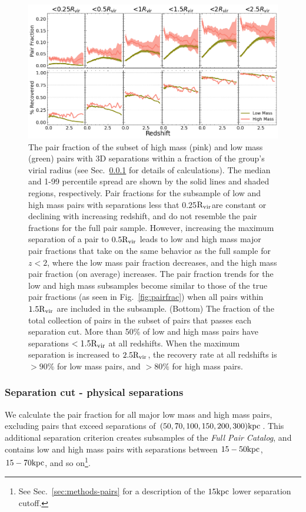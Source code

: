 \documentclass[twocolumn]{aastex631}
\newcommand{\paircat}{\textit{Full Pair Catalog}}
\newcommand{\Rvir}{\ensuremath{\rm R_{vir}}}
\begin{document}
    \begin{figure}[htp]
        \centering
        \includegraphics[width=\textwidth]{pairfrac_vircut.png}
        \caption{ The pair fraction of the subset of high mass (pink) and low mass (green) pairs with 3D separations within a fraction of the group's virial radius (see Sec.~\ref{sec:results-frac-sepcut} for details of calculations). 
        The median and 1-99 percentile spread are shown by the solid lines and shaded regions, respectively.
        Pair fractions for the subsample of low and high mass pairs with separations less that 0.25\Rvir are constant or declining with increasing redshift, and do not resemble the pair fractions for the full pair sample. 
        However, increasing the maximum separation of a pair to $0.5\Rvir$ leads to low and high mass major pair fractions that take on the same behavior as the full sample for $z<2$, where the low mass pair fraction decreases, and the high mass pair fraction (on average) increases. 
        The pair fraction trends for the low and high mass subsamples become similar to those of the true pair fractions (as seen in Fig.~\ref{fig:pairfrac}) when all pairs within $1.5\Rvir$ are included in the subsample.
        (Bottom) The fraction of the total collection of pairs in the subset of pairs that passes each separation cut.
        More than 50\% of low and high mass pairs have separations $<1.5\Rvir$ at all redshifts. 
        When the maximum separation is increased to $2.5\Rvir$, the recovery rate at all redshifts is $>90\%$ for low mass pairs, and $>80\%$ for high mass pairs. 
        }
      \label{fig:vircut}
    \end{figure}

\subsubsection{Separation cut - physical separations}\label{sec:results-frac-sepcut}
    We calculate the pair fraction for all major low mass and high mass pairs, excluding pairs that exceed separations of $(50,70,100,150,200,300)\mathrm{kpc}$. 
    This additional separation criterion creates subsamples of the \paircat, and contains low and high mass pairs with separations between $15-50\mathrm{kpc}$, $15-70\mathrm{kpc}$, and so on\footnote{See Sec.~\ref{sec:methods-pairs} for a description of the $15\mathrm{kpc}$ lower separation cutoff.}.
\end{document}
